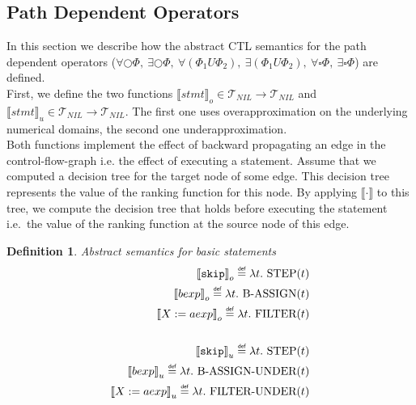 \documentclass[11pt,a4paper,titlepage]{article}
\newtheorem{definition}{Definition}[section]
\newcommand\eqdef{\mathrel{\overset{\makebox[0pt]{\mbox{\normalfont\tiny\sffamily def}}}{=}}}
\begin{document}
\subsection{Path Dependent Operators}

In this section we describe how the abstract CTL semantics for the path dependent operators 
($\forall\bigcirc\Phi,\ \exists\bigcirc\Phi,\ \forall(\Phi_1 U \Phi_2),\ \exists(\Phi_1 U \Phi_2),\ \forall\square\Phi,\ \exists\square\Phi$)
are defined.\\

First, we define the two functions ${\llbracket stmt \rrbracket}_o \in \mathcal{T}_{NIL} \rightarrow \mathcal{T}_{NIL}$
and ${\llbracket stmt \rrbracket}_u \in \mathcal{T}_{NIL} \rightarrow \mathcal{T}_{NIL}$. 
The first one uses overapproximation on the underlying numerical domains, the second one underapproximation.\\

Both functions implement the effect of backward propagating an edge 
in the control-flow-graph i.e. the effect of executing a statement. 
Assume that we computed a decision tree for the target node of some edge. 
This decision tree represents the value of the ranking function for this node. 
By applying ${\llbracket \cdot \rrbracket}$ to this tree, we compute the decision tree 
that holds before executing the statement i.e.\ the value of the ranking function at the source node of this edge.



\begin{definition}\label{def:basic_expression_transformer}
    Abstract semantics for basic statements
    \begin{align*}
        {\llbracket \mathtt{skip} \rrbracket}_o \eqdef \lambda t. \ \text{STEP}(t)\\
        {\llbracket bexp \rrbracket}_o \eqdef \lambda t. \ \text{B-ASSIGN}(t)\\
        {\llbracket X := aexp \rrbracket}_o \eqdef \lambda t. \ \text{FILTER}(t)\\
        \\
        {\llbracket \mathtt{skip} \rrbracket}_u \eqdef \lambda t. \ \text{STEP}(t)\\
        {\llbracket bexp \rrbracket}_u \eqdef \lambda t. \ \text{B-ASSIGN-UNDER}(t)\\
        {\llbracket X := aexp \rrbracket}_u \eqdef \lambda t. \ \text{FILTER-UNDER}(t)\\
    \end{align*}
\end{definition}
\end{document}
